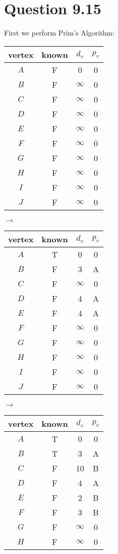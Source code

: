 \documentclass[12pt]{article}
\begin{document}
\section{Question 9.15}
First we perform Prim's Algorithm:
\begin{center}
\begin{tabular}{ c c c c } 
vertex & known & $d_v$ & $p_v$ \\
 \hline
$A$ & F & 0 & 0 \\
$B$ & F & $\infty$ & 0 \\
$C$ & F & $\infty$ & 0 \\
$D$ & F & $\infty$ & 0 \\
$E$ & F & $\infty$ & 0 \\
$F$ & F & $\infty$ & 0 \\
$G$ & F & $\infty$ & 0 \\
$H$ & F & $\infty$ & 0 \\
$I$ & F & $\infty$ & 0 \\
$J$ & F & $\infty$ & 0 \\
\end{tabular}
$\rightarrow$
\begin{tabular}{ c c c c } 
vertex & known & $d_v$ & $p_v$ \\
 \hline
$A$ & T & 0 & 0 \\
$B$ & F & 3 & A \\
$C$ & F & $\infty$ & 0 \\
$D$ & F & 4 & A \\
$E$ & F & 4 & A \\
$F$ & F & $\infty$ & 0 \\
$G$ & F & $\infty$ & 0 \\
$H$ & F & $\infty$ & 0 \\
$I$ & F & $\infty$ & 0 \\
$J$ & F & $\infty$ & 0 \\
\end{tabular}
$\rightarrow$
\begin{tabular}{ c c c c } 
vertex & known & $d_v$ & $p_v$ \\
 \hline
$A$ & T & 0 & 0 \\
$B$ & T & 3 & A \\
$C$ & F & 10 & B \\
$D$ & F & 4 & A \\
$E$ & F & 2 & B \\
$F$ & F & 3 & B \\
$G$ & F & $\infty$ & 0 \\
$H$ & F & $\infty$ & 0 \\

\end{tabular}
\end{center}
\end{document}
